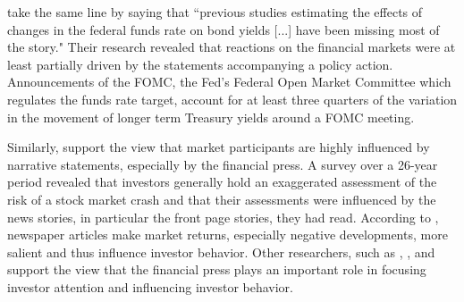 \documentclass[11pt,a4paper,english,oneside]{book}
\numberwithin{equation}{chapter}
\begin{document}
\citet[~pp. 86--87]{Gurkaynak.2004} take the same line by saying that ``previous studies estimating the effects of changes in the federal funds rate on bond yields [...] have been missing most of the story." Their research revealed that reactions on the financial markets were at least partially driven by the statements accompanying a policy action. Announcements of the FOMC, the Fed's Federal Open Market Committee which regulates the funds rate target, account for at least three quarters of the variation in the movement of longer term Treasury yields around a FOMC meeting.

Similarly, \cite{Goetzmann.2016} support the view that market participants are highly influenced by narrative statements, especially by the financial press. A survey over a 26-year period revealed that investors generally hold an exaggerated assessment of the risk of a stock market crash and that their assessments were influenced by the news stories, in particular the front page stories, they had read. %
According to \cite{Goetzmann.2016}, newspaper articles make market returns, especially negative developments, more salient and thus influence investor behavior. Other researchers, such as \cite{Engelberg.2011}, \cite{Kraussl.2014}, and \cite{Yuan.2015} support the view that the financial press plays an important role in focusing investor attention and influencing investor behavior.

\end{document}
